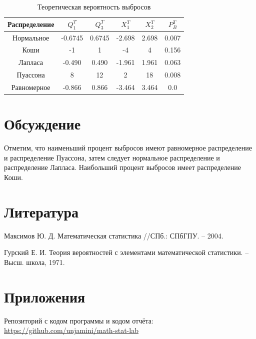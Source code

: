 \begin{table}[H]
\caption{Теоретическая вероятность выбросов}
\begin{center}
 \begin{tabular}{||c || c c c c c||} 
 \hline
 Распределение & \(Q_{1}^T\)  & \(Q_{3}^T\) & \(X_{1}^T\) & \(X_{2}^T\) & \(P_{B}^T\) \\ 
 \hline\hline
  Нормальное  & -0.6745 & 0.6745 & -2.698 & 2.698  & 0.007 \\ 
 \hline
 Коши         & -1      &  1 &  -4 & 4 &  0.156 \\
 \hline
  Лапласа     & -0.490  &  0.490 & -1.961 & 1.961 &  0.063 \\
 \hline
  Пуассона    & 8       &  12 & 2 & 18 &  0.008 \\
 \hline
  Равномерное & -0.866  &  0.866 &  -3.464 & 3.464 & 0.0  \\
 \hline
\end{tabular}
\end{center}
\end{table}



\section{Обсуждение}
Отметим, что наименьший процент выбросов имеют равномерное распределение и распределение Пуассона, затем следует нормальное распределение и распределение Лапласа. Наибольший процент выбросов имеет распределение Коши.


\section{Литература}
Максимов Ю. Д. Математическая статистика //СПб.: СПбГПУ. – 2004.

Гурский Е. И. Теория вероятностей с элементами математической статистики. – Высш. школа, 1971.

\section{Приложения}

Репозиторий с кодом программы и кодом отчёта: \href{https://github.com/unjamini/math-stat-lab}{https://github.com/unjamini/math-stat-lab}




